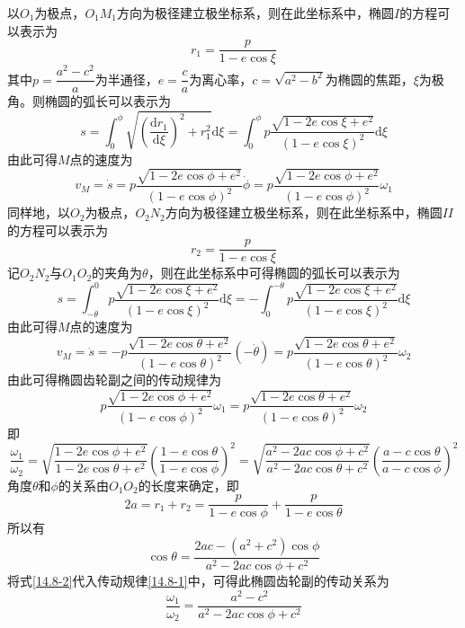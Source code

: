 \begin{solution}
以$O_1$为极点，$O_1M_1$方向为极径建立极坐标系，则在此坐标系中，椭圆$I$的方程可以表示为
\begin{equation*}
	r_1 = \frac{p}{1-e\cos \xi}
\end{equation*}
其中$p = \dfrac{a^2-c^2}{a}$为半通径，$e=\dfrac{c}{a}$为离心率，$c=\sqrt{a^2-b^2}$为椭圆的焦距，$\xi$为极角。则椭圆的弧长可以表示为
\begin{equation*}
	s = \int_0^\phi \sqrt{\left(\frac{\mathrm{d} r_1}{\mathrm{d} \xi}\right)^2+r_1^2} \mathrm{d} \xi = \int_0^\phi p \frac{\sqrt{1-2e\cos\xi+e^2}}{(1-e\cos\xi)^2} \mathrm{d} \xi
\end{equation*}
由此可得$M$点的速度为
\begin{equation*}
	v_M = \dot{s} = p \frac{\sqrt{1-2e\cos\phi+e^2}}{(1-e\cos\phi)^2} \dot{\phi} = p \frac{\sqrt{1-2e\cos\phi+e^2}}{(1-e\cos\phi)^2} \omega_1
\end{equation*}
同样地，以$O_2$为极点，$O_2N_2$方向为极径建立极坐标系，则在此坐标系中，椭圆$II$的方程可以表示为
\begin{equation*}
	r_2 = \frac{p}{1-e\cos \xi}
\end{equation*}
记$O_2N_2$与$O_1O_2$的夹角为$\theta$，则在此坐标系中可得椭圆的弧长可以表示为
\begin{equation*}
	s = \int_{-\theta}^0 p \frac{\sqrt{1-2e\cos\xi+e^2}}{(1-e\cos\xi)^2} \mathrm{d} \xi = -\int_0^{-\theta} p \frac{\sqrt{1-2e\cos\xi+e^2}}{(1-e\cos\xi)^2} \mathrm{d} \xi
\end{equation*}
由此可得$M$点的速度为
\begin{equation*}
	v_M = \dot{s} = -p \frac{\sqrt{1-2e\cos\theta+e^2}}{(1-e\cos\theta)^2} (-\dot{\theta}) = p \frac{\sqrt{1-2e\cos\theta+e^2}}{(1-e\cos\theta)^2} \omega_2
\end{equation*}
由此可得椭圆齿轮副之间的传动规律为
\begin{equation*}
	p \frac{\sqrt{1-2e\cos\phi+e^2}}{(1-e\cos\phi)^2} \omega_1 = p \frac{\sqrt{1-2e\cos\theta+e^2}}{(1-e\cos\theta)^2} \omega_2
\end{equation*}
即
\begin{equation}
	\frac{\omega_1}{\omega_2} = \sqrt{\frac{1-2e\cos\phi+e^2}{1-2e\cos\theta+e^2}} \left(\frac{1-e\cos\theta}{1-e\cos\phi}\right)^2 = \sqrt{\frac{a^2-2ac\cos \phi + c^2}{a^2-2ac\cos \theta + c^2}} \left(\frac{a-c\cos\theta}{a-c\cos\phi}\right)^2
	\label{14.8-1}
\end{equation}
角度$\theta$和$\phi$的关系由$O_1O_2$的长度来确定，即
\begin{equation*}
	2a = r_1+r_2 = \frac{p}{1-e\cos \phi} + \frac{p}{1-e\cos \theta}
\end{equation*}
所以有
\begin{equation}
	\cos \theta = \frac{2ac-(a^2+c^2)\cos \phi}{a^2-2ac\cos \phi + c^2}
	\label{14.8-2}
\end{equation}
将式\eqref{14.8-2}代入传动规律\eqref{14.8-1}中，可得此椭圆齿轮副的传动关系为
\begin{equation*}
	\frac{\omega_1}{\omega_2} = \frac{a^2-c^2}{a^2-2ac\cos\phi+c^2}
\end{equation*}
\end{solution}

